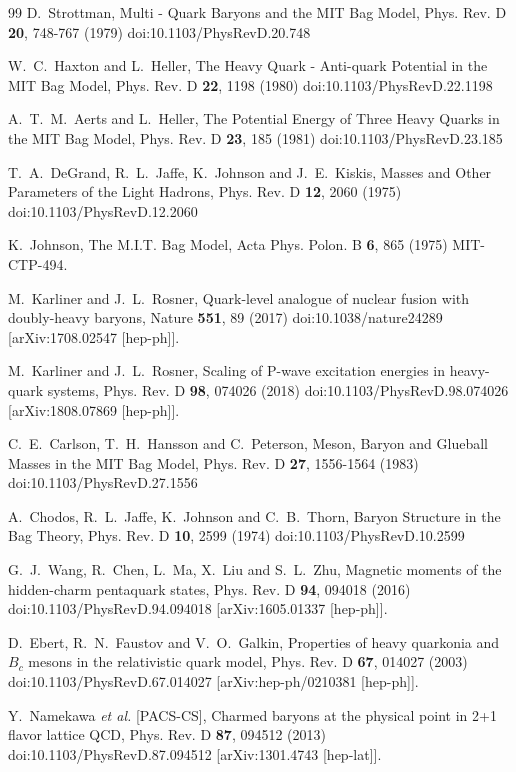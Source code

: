 \documentclass[12pt,onecolumn,floatfix,nofootinbib]{revtex4}
\begin{document}
\begin{thebibliography}{99}
 D.~Strottman, Multi - Quark Baryons and the MIT
Bag Model, Phys. Rev. D \textbf{20}, 748-767 (1979)
doi:10.1103/PhysRevD.20.748

 W.~C.~Haxton and L.~Heller, The Heavy Quark -
Anti-quark Potential in the {MIT} Bag Model, Phys. Rev. D \textbf{22}, 1198
(1980) doi:10.1103/PhysRevD.22.1198

 A.~T.~M.~Aerts and L.~Heller, The Potential Energy of
Three Heavy Quarks in the {MIT} Bag Model, Phys. Rev. D \textbf{23}, 185
(1981) doi:10.1103/PhysRevD.23.185

 T.~A.~DeGrand, R.~L.~Jaffe, K.~Johnson and
J.~E.~Kiskis, Masses and Other Parameters of the Light Hadrons, Phys. Rev. D
\textbf{12}, 2060 (1975) doi:10.1103/PhysRevD.12.2060

 K.~Johnson, The M.I.T. Bag Model, Acta Phys. Polon.
B \textbf{6}, 865 (1975) MIT-CTP-494.

 M.~Karliner and J.~L.~Rosner, Quark-level
analogue of nuclear fusion with doubly-heavy baryons, Nature \textbf{551},
89 (2017) doi:10.1038/nature24289 [arXiv:1708.02547 [hep-ph]].

 M.~Karliner and J.~L.~Rosner, Scaling of P-wave
excitation energies in heavy-quark systems, Phys. Rev. D \textbf{98}, 074026
(2018) doi:10.1103/PhysRevD.98.074026 [arXiv:1808.07869 [hep-ph]].

 C.~E.~Carlson, T.~H.~Hansson and C.~Peterson,
Meson, Baryon and Glueball Masses in the MIT Bag Model, Phys. Rev. D \textbf{%
27}, 1556-1564 (1983) doi:10.1103/PhysRevD.27.1556

 A.~Chodos, R.~L.~Jaffe, K.~Johnson and C.~B.~Thorn,
Baryon Structure in the Bag Theory, Phys. Rev. D \textbf{10}, 2599 (1974)
doi:10.1103/PhysRevD.10.2599

 G.~J.~Wang, R.~Chen, L.~Ma, X.~Liu and S.~L.~Zhu,
Magnetic moments of the hidden-charm pentaquark states, Phys. Rev. D \textbf{%
94}, 094018 (2016) doi:10.1103/PhysRevD.94.094018 [arXiv:1605.01337
[hep-ph]].

 D.~Ebert, R.~N.~Faustov and V.~O.~Galkin, Properties
of heavy quarkonia and $B_c$ mesons in the relativistic quark model, Phys.
Rev. D \textbf{67}, 014027 (2003) doi:10.1103/PhysRevD.67.014027
[arXiv:hep-ph/0210381 [hep-ph]].

 Y.~Namekawa \textit{et al.} [PACS-CS], Charmed
baryons at the physical point in 2+1 flavor lattice QCD, Phys. Rev. D
\textbf{87}, 094512 (2013) doi:10.1103/PhysRevD.87.094512 [arXiv:1301.4743
[hep-lat]].


\end{thebibliography}
\end{document}
